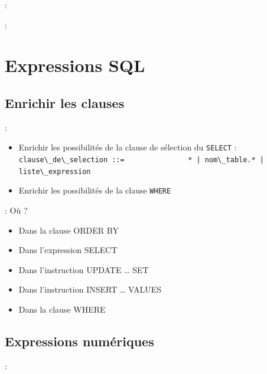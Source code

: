 \documentclass[10pt]{beamer}
\begin{document}
\begin{frame}{\secname : \subsecname}
    
\end{frame}

\begin{frame}{\secname : \subsecname}
    
\end{frame}
\section{Expressions SQL}
\tocss
\subsection{Enrichir les clauses}
\begin{frame}{\secname : \subsecname}
    \begin{itemize}
        \item Enrichir les possibilités de la clause de sélection du \lstinline[language=plsql]!SELECT! : \lstinline[language=bnf]!clause\_de\_selection ::=
              * | nom\_table.* | liste\_expression!
        \item Enrichir les possibilités de la clause \lstinline[language=plsql]!WHERE!
    \end{itemize}
    
\end{frame}

\begin{frame}{\secname : \subsecname}
    Où ?
    \begin{itemize}
        \item Dans la clause ORDER BY
        \item Dans l'expression SELECT
        \item Dans l'instruction UPDATE … SET
        \item Dans l'instruction INSERT … VALUES
        \item Dans la clause WHERE
    \end{itemize}
\end{frame}
\subsection{Expressions numériques}
\begin{frame}{\secname : \subsecname}
    
\end{frame}
\end{document}
